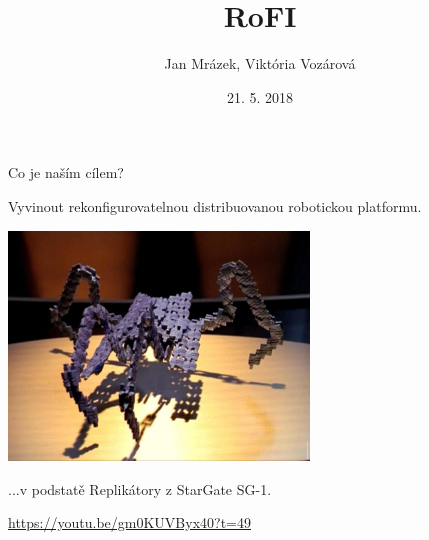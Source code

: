 \documentclass{beamer}
\title[RoFI]{RoFI}
\author{Jan Mrázek, Viktória Vozárová}
\institute{ParaDiSe}
\date{21. 5. 2018}
\begin{document}
\begin{frame}
  \titlepage
\end{frame}

\begin{frame}{Co je naším cílem?}

    Vyvinout rekonfigurovatelnou distribuovanou robotickou platformu.

    \pause

    \begin{center}
    \includegraphics[width=0.6\textwidth]{img/replicator2}

    ...v podstatě Replikátory z StarGate SG-1.

    \url{https://youtu.be/gm0KUVByx40?t=49}
    \end{center}

\end{frame}
\end{document}
